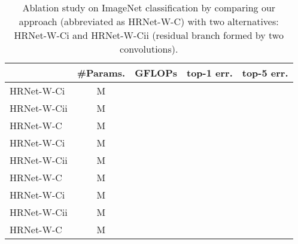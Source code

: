 \documentclass[10pt,twocolumn,letterpaper]{article}
\begin{document}
	\begin{table}[ht]
	\setlength{\tabcolsep}{8.8pt}
	\tiny
	\scriptsize
	\centering
	\caption{Ablation study on ImageNet classification
	by comparing our approach (abbreviated as HRNet-W-C) with two alternatives: HRNet-W-Ci and HRNet-W-Cii (residual branch formed by two  convolutions).}
	\begin{tabular}{l|cc|cc}
		\hline
		& \#Params. & GFLOPs & top-1 err. & top-5 err.\\
		\hline
	    HRNet-W-Ci& M &  &  &  \\
        HRNet-W-Cii& M &  &  &  \\
	    HRNet-W-C& M &  &  &  \\
        \hline
        HRNet-W-Ci& M &  &  &  \\
        HRNet-W-Cii& M &  &  &  \\
	    HRNet-W-C& M &  &  &  \\
        \hline
        HRNet-W-Ci& M &  &  &  \\
        HRNet-W-Cii&  M &  &  &  \\
	    HRNet-W-C& M &  &  &  \\
	    \hline
	\end{tabular}
	\label{tab:ImageNetClassificationAblationStudy}
	\vspace{-5mm}
	\end{table}
	
\end{document}
